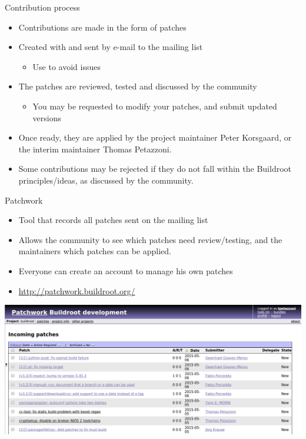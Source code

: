 \begin{frame}{Contribution process}
  \begin{itemize}
  \item Contributions are made in the form of patches
  \item Created with  and sent by e-mail to the mailing list
    \begin{itemize}
    \item Use  to avoid issues
    \end{itemize}
  \item The patches are reviewed, tested and discussed by the
    community
    \begin{itemize}
    \item You may be requested to modify your patches, and submit
      updated versions
    \end{itemize}
  \item Once ready, they are applied by the project maintainer Peter
    Korsgaard, or the interim maintainer Thomas Petazzoni.
  \item Some contributions may be rejected if they do not fall within
    the Buildroot principles/ideas, as discussed by the community.
  \end{itemize}
\end{frame}

\begin{frame}{Patchwork}
  \begin{itemize}
  \item Tool that records all patches sent on the mailing list
  \item Allows the community to see which patches need review/testing,
    and the maintainers which patches can be applied.
  \item Everyone can create an account to manage his own patches
  \item \url{http://patchwork.buildroot.org/}
  \end{itemize}

  \begin{center}
    \includegraphics[width=\textwidth]{slides/buildroot-support-contribution/patchwork.png}
  \end{center}
\end{frame}

